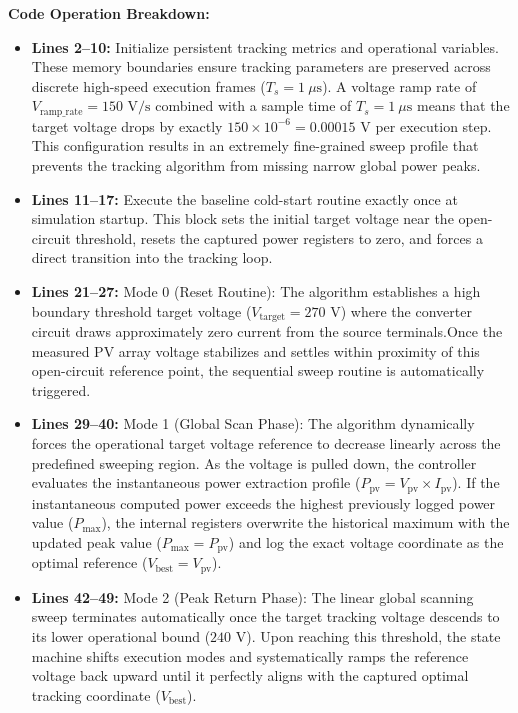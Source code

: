 \medskip
\noindent\textbf{Code Operation Breakdown:}
\begin{itemize}
    \item \textbf{Lines 2--10:} Initialize persistent tracking metrics and operational variables. These memory boundaries ensure tracking parameters are preserved across discrete high-speed execution frames ($T_s = 1\ \mu\text{s}$). A voltage ramp rate of $V_{\text{ramp\_rate}} = 150\text{ V/s}$ combined with a sample time of $T_s = 1\ \mu\text{s}$ means that the target voltage drops by exactly $150 \times 10^{-6} = 0.00015\text{ V}$ per execution step. This configuration results in an extremely fine-grained sweep profile that prevents the tracking algorithm from missing narrow global power peaks.
    
    \item \textbf{Lines 11--17:} Execute the baseline cold-start routine exactly once at simulation startup. This block sets the initial target voltage near the open-circuit threshold, resets the captured power registers to zero, and forces a direct transition into the tracking loop.
    \newpage
    \item \textbf{Lines 21--27:} Mode 0 (Reset Routine): The algorithm establishes a high boundary threshold target voltage ($V_{\text{target}} = 270\text{ V}$) where the converter circuit draws approximately zero current from the source terminals.Once the measured PV array voltage stabilizes and settles within proximity of this open-circuit reference point, the sequential sweep routine is automatically triggered.
    
    \item \textbf{Lines 29--40:} Mode 1 (Global Scan Phase): The algorithm dynamically forces the operational target voltage reference to decrease linearly across the predefined sweeping region. As the voltage is pulled down, the controller evaluates the instantaneous power extraction profile ($P_{\text{pv}} = V_{\text{pv}} \times I_{\text{pv}}$). If the instantaneous computed power exceeds the highest previously logged power value ($P_{\text{max}}$), the internal registers overwrite the historical maximum with the updated peak value ($P_{\text{max}} = P_{\text{pv}}$) and log the exact voltage coordinate as the optimal reference ($V_{\text{best}} = V_{\text{pv}}$).
    
    \item \textbf{Lines 42--49:} Mode 2 (Peak Return Phase): The linear global scanning sweep terminates automatically once the target tracking voltage descends to its lower operational bound ($240\text{ V}$). Upon reaching this threshold, the state machine shifts execution modes and systematically ramps the reference voltage back upward until it perfectly aligns with the captured optimal tracking coordinate ($V_{\text{best}}$).
    

\end{itemize}
